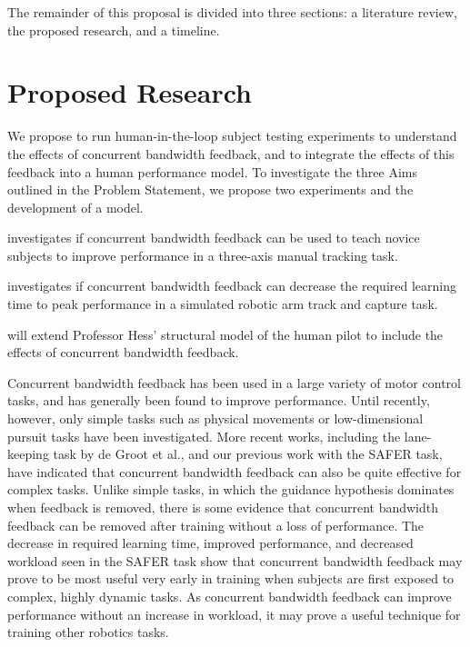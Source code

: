 The remainder of this proposal is divided into three sections: a literature review, the proposed research, and a timeline.


% 

\section{Proposed Research}
We propose to run human-in-the-loop subject testing experiments to understand the effects of concurrent bandwidth feedback, and to integrate the effects of this feedback into a human performance model.
To investigate the three Aims outlined in the Problem Statement, we propose two experiments and the development of a model.

\begin{description}[align=left]
    \item [Experiment One] investigates if concurrent bandwidth feedback can be used to teach novice subjects to improve performance in a three-axis manual tracking task.
    \item [Experiment Two] investigates if concurrent bandwidth feedback can decrease the required learning time to peak performance in a simulated robotic arm track and capture task.
    \item [The Model] will extend Professor Hess' structural model of the human pilot to include the effects of concurrent bandwidth feedback.
\end{description}

Concurrent bandwidth feedback has been used in a large variety of motor control tasks, and has generally been found to improve performance.
Until recently, however, only simple tasks such as physical movements or low-dimensional pursuit tasks have been investigated.
More recent works, including the lane-keeping task by de Groot et al., and our previous work with the SAFER task, have indicated that concurrent bandwidth feedback can also be quite effective for complex tasks.
Unlike simple tasks, in which the guidance hypothesis dominates when feedback is removed, there is some evidence that concurrent bandwidth feedback can be removed after training without a loss of performance.
The decrease in required learning time, improved performance, and decreased workload seen in the SAFER task show that concurrent bandwidth feedback may prove to be most useful very early in training when subjects are first exposed to complex, highly dynamic tasks.
As concurrent bandwidth feedback can improve performance without an increase in workload, it may prove a useful technique for training other robotics tasks.

